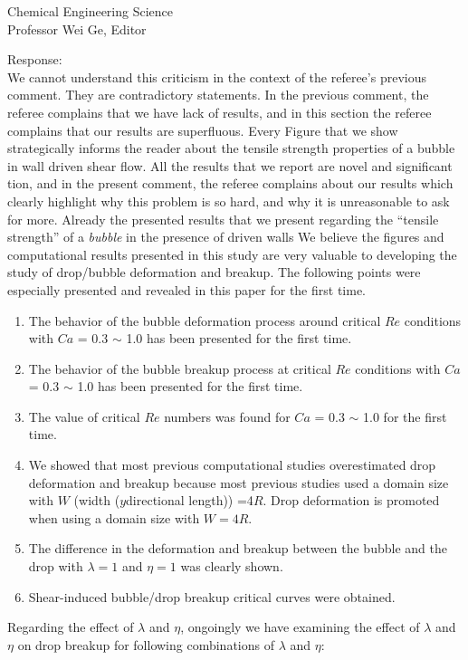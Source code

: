 \documentclass{letter}
\begin{document}
\begin{letter}{
Chemical Engineering Science\\
Professor Wei Ge, Editor\\}
\begin{enumerate}
Response: \\
		We cannot understand this criticism in the context of the referee's previous comment.  They are contradictory statements.  In the previous comment, the referee complains that we have lack of results, and in this section the referee complains that our results are superfluous.  Every Figure that we show strategically informs the reader about the tensile strength properties of a bubble in wall driven shear flow.  All the results that we report are novel and significant tion, and in the present comment, the referee complains about our results which clearly highlight why this problem is so hard, and why it is unreasonable to ask for more.  Already the presented results that we present regarding the ``tensile strength'' of a {\em bubble} in the presence of driven walls
We believe the figures and computational results presented in this study are very valuable to developing the study of drop/bubble deformation and breakup.
The following points were especially presented and revealed in this paper for the first time. \\
\begin{enumerate}
\item The behavior of the bubble deformation process around critical $Re$ conditions with $Ca$ = 0.3  $\sim$ 1.0 has been presented for the first time.
\item The behavior of the bubble breakup process at critical $Re$ conditions with $Ca$ = 0.3  $\sim$ 1.0 has been presented for the first time.
\item The value of critical $Re$ numbers was found for $Ca$ = 0.3  $\sim$ 1.0 for the first time.
\item  We showed that most previous computational studies overestimated drop deformation and breakup because most previous studies used a domain size with $W$ (width ($y$directional length)) =4$R$. Drop deformation is promoted when using a domain size with $W=4R$. 
\item The difference in the deformation and breakup between the bubble and the drop with $\lambda = 1$ and $\eta = 1$ was clearly shown.
\item Shear-induced bubble/drop breakup critical curves were obtained. 
\end{enumerate}

Regarding the effect of $\lambda$ and $\eta$, ongoingly we have examining the effect of $\lambda$ and $\eta$ on drop breakup for following 
combinations of $\lambda$ and $\eta$:


\end{enumerate}
\end{letter}
\end{document}
